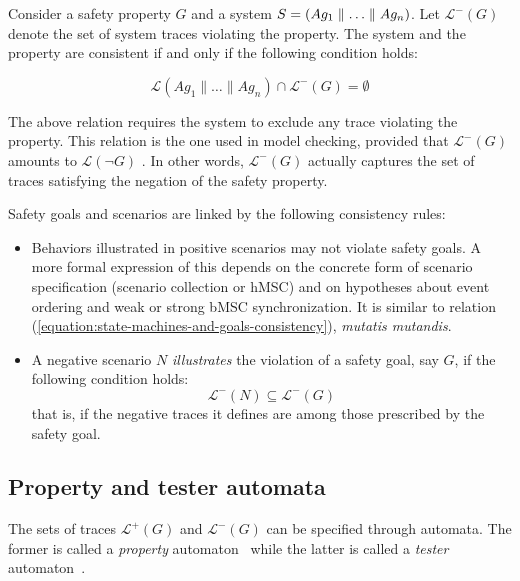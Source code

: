 Consider a safety property $G$ and a system $S = (Ag_1 \parallel \ldots \parallel Ag_n)$. Let $\mathcal{L}^{-}(G)$ denote the set of system traces violating the property. The system and the property are consistent if and only if the following condition holds:

\begin{equation}
\mathcal{L}(Ag_1 \parallel \ldots \parallel Ag_n) \cap \mathcal{L}^{-}(G) = \emptyset
\label{equation:state-machines-and-goals-consistency}
\end{equation}

The above relation requires the system to exclude any trace violating the property. This relation is the one used in model checking, provided that $\mathcal{L}^{-}(G)$ amounts to $\mathcal{L}(\neg G)$ \cite{Clarke:1989}. In other words, $\mathcal{L}^{-}(G)$ actually captures the set of traces satisfying the negation of the safety property. 

Safety goals and scenarios are linked by the following consistency rules:

\begin{itemize}
\item Behaviors illustrated in positive scenarios may not violate safety goals. A more formal expression of this depends on the concrete form of scenario specification (scenario collection or hMSC) and on hypotheses about event ordering and weak or strong bMSC synchronization. It is similar to relation (\ref{equation:state-machines-and-goals-consistency}), \emph{mutatis mutandis}.
\item A negative scenario $N$ \emph{illustrates} the violation of a safety goal, say $G$, if the following condition holds:
\begin{equation}
\mathcal{L}^{-}(N) \subseteq \mathcal{L}^{-}(G)
\end{equation}
\noindent that is, if the negative traces it defines are among those prescribed by the safety goal.
\end{itemize}

\subsection{Property and tester automata\label{subsection:background-property-and-tester-automata}}

The sets of traces $\mathcal{L}^{+}(G)$ and $\mathcal{L}^{-}(G)$ can be specified through automata. The former is called a \emph{property} automaton~\cite{Letier:2005, Letier:2008} while the latter is called a \emph{tester} automaton~\cite{Giannakopoulou:2003}.

